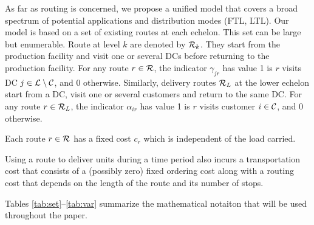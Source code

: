 \documentclass[a4paper,10pt]{article}
\begin{document}
\begin{linenumbers}
As far as routing is concerned, we propose a unified model that covers a broad spectrum of potential applications and distribution modes (FTL, LTL). 
Our model is based on a set of existing routes at each echelon. 
This set can be large but enumerable. 
Route at level $k$ are denoted by $\mathcal{R}_k$. 
They start from the production facility and visit one or several DCs before returning to the production facility. 
For any route $r \in \mathcal{R}$, the indicator $\gamma_{jr}$ has value 1 is $r$ visits DC $j \in \mathcal{L}\setminus{\mathcal{C}}$, and 0 otherwise. 
Similarly, delivery routes $\mathcal{R}_L$ at the lower echelon start from a DC, visit one or several customers and return to the same DC. 
For any route $r \in \mathcal{R}_L$, the indicator $\alpha_{ir}$ has value 1 is $r$ visits customer $i \in \mathcal{C}$, and 0 otherwise. 

Each route 	$r\in \mathcal{R}$ has a fixed cost 	$c_r$ which is independent of the load carried. 




Using a route to deliver units during a time period also incurs a transportation cost that consists of a (possibly zero) fixed ordering cost along with a routing cost that depends on the length of the route and its number of stops.

Tables \ref{tab:set}--\ref{tab:var} summarize the mathematical notaiton that will be used throughout the paper.


\end{linenumbers}
\end{document}
